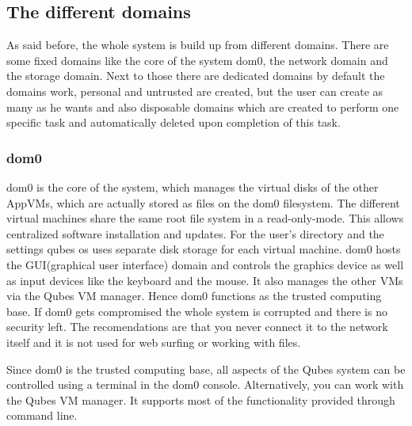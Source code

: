 \documentclass[runningheads,a4paper]{article}
\begin{document}
\subsection{The different domains}
As said before, the whole system is build up from different
domains. There are some fixed domains like the core of the system
dom0, the network domain and the storage domain. Next to those there
are dedicated domains by default the domains work, personal and untrusted are created, but the
user can create as many as he wants and also disposable domains which
are created to perform one specific task and automatically deleted upon completion
of this task.

\subsubsection{dom0}

dom0 is the core of the system, which manages the virtual disks of the
other AppVMs, which are actually stored as files on the dom0
filesystem. The different virtual machines share the same root file
system in a read-only-mode. This allows centralized software
installation and updates. For the user's directory and the settings
qubes os uses separate disk storage for each virtual machine. 
dom0  hosts the GUI(graphical user interface) domain and controls the
graphics device as well as input devices like the keyboard and the
mouse. It also
manages the other VMs via the Qubes VM manager. Hence dom0 functions as the trusted computing base. If dom0
gets compromised the whole system is corrupted and there is no
security left. The recomendations are that you never connect it to the
network itself and it is not used for web surfing or working with
files.

Since dom0 is the trusted computing base, all aspects of the Qubes
system can be controlled using a terminal in the dom0 console. 
Alternatively, you can work with the Qubes VM
manager. It supports most of the functionality provided through
command line. 
\end{document}
